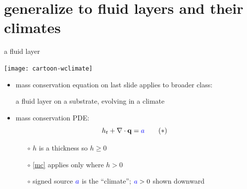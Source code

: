 \documentclass[xcolor={dvipsnames}]{beamer}
\newcommand\bq{\mathbf{q}}
\newcommand\Div{\nabla\cdot}
\begin{document}

\section{generalize to fluid layers and their climates}

\begin{frame}{a fluid layer}

\begin{center}
\texttt{[image: cartoon-wclimate]}
\end{center}

\vspace{-7mm}
\begin{itemize}
\item mass conservation equation on last slide applies to broader class:
  \begin{center}
  \alert{a fluid layer on a substrate, evolving in a climate}
  \end{center}
\item mass conservation PDE:
\begin{equation}
h_t + \Div\bq = {\color{blue} a}  \tag{$\ast$} \label{mc}
\end{equation}
    \begin{itemize}
    \vspace{-4mm}
    \item[$\circ$] $h$ is a thickness so $h\ge 0$
    \item[$\circ$] \eqref{mc} applies only where $h>0$
    \item[$\circ$] signed source ${\color{blue} a}$ is the ``climate''; ${\color{blue} a}>0$ shown downward
    \end{itemize}
\end{itemize}
\end{frame}
\end{document}
